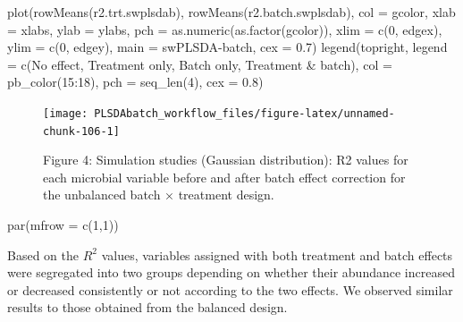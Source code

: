 \documentclass[
]{book}
\newenvironment{Shaded}{\begin{snugshade}}{\end{snugshade}}
\newcommand{\AttributeTok}[1]{\textcolor[rgb]{0.77,0.63,0.00}{#1}}
\newcommand{\DecValTok}[1]{\textcolor[rgb]{0.00,0.00,0.81}{#1}}
\newcommand{\FloatTok}[1]{\textcolor[rgb]{0.00,0.00,0.81}{#1}}
\newcommand{\FunctionTok}[1]{\textcolor[rgb]{0.00,0.00,0.00}{#1}}
\newcommand{\NormalTok}[1]{#1}
\newcommand{\SpecialCharTok}[1]{\textcolor[rgb]{0.00,0.00,0.00}{#1}}
\newcommand{\StringTok}[1]{\textcolor[rgb]{0.31,0.60,0.02}{#1}}
\begin{document}
\begin{Shaded}
\begin{Highlighting}[]
\FunctionTok{plot}\NormalTok{(}\FunctionTok{rowMeans}\NormalTok{(r2.trt.swplsdab), }\FunctionTok{rowMeans}\NormalTok{(r2.batch.swplsdab), }\AttributeTok{col =}\NormalTok{ gcolor, }
     \AttributeTok{xlab =}\NormalTok{ xlabs, }\AttributeTok{ylab =}\NormalTok{ ylabs, }\AttributeTok{pch =} \FunctionTok{as.numeric}\NormalTok{(}\FunctionTok{as.factor}\NormalTok{(gcolor)),}
     \AttributeTok{xlim =} \FunctionTok{c}\NormalTok{(}\DecValTok{0}\NormalTok{, edgex), }\AttributeTok{ylim =} \FunctionTok{c}\NormalTok{(}\DecValTok{0}\NormalTok{, edgey), }\AttributeTok{main =} \StringTok{\textquotesingle{}swPLSDA{-}batch\textquotesingle{}}\NormalTok{, }\AttributeTok{cex =} \FloatTok{0.7}\NormalTok{)}
\FunctionTok{legend}\NormalTok{(}\StringTok{\textquotesingle{}topright\textquotesingle{}}\NormalTok{, }\AttributeTok{legend =} \FunctionTok{c}\NormalTok{(}\StringTok{\textquotesingle{}No effect\textquotesingle{}}\NormalTok{, }\StringTok{\textquotesingle{}Treatment only\textquotesingle{}}\NormalTok{, }
                              \StringTok{\textquotesingle{}Batch only\textquotesingle{}}\NormalTok{, }\StringTok{\textquotesingle{}Treatment \& batch\textquotesingle{}}\NormalTok{), }
       \AttributeTok{col =} \FunctionTok{pb\_color}\NormalTok{(}\DecValTok{15}\SpecialCharTok{:}\DecValTok{18}\NormalTok{), }\AttributeTok{pch =} \FunctionTok{seq\_len}\NormalTok{(}\DecValTok{4}\NormalTok{), }\AttributeTok{cex =} \FloatTok{0.8}\NormalTok{)}
\end{Highlighting}
\end{Shaded}

\begin{figure}

{\centering \texttt{[image: PLSDAbatch\_workflow\_files/figure-latex/unnamed-chunk-106-1]} 

}

\caption{Figure 4: Simulation studies (Gaussian distribution): R2 values for each microbial variable before and after batch effect correction for the unbalanced batch × treatment design.}\label{fig:unnamed-chunk-106}
\end{figure}

\begin{Shaded}
\begin{Highlighting}[]
\FunctionTok{par}\NormalTok{(}\AttributeTok{mfrow =} \FunctionTok{c}\NormalTok{(}\DecValTok{1}\NormalTok{,}\DecValTok{1}\NormalTok{))}
\end{Highlighting}
\end{Shaded}

Based on the \(R^2\) values, variables assigned with both treatment and batch effects were segregated into two groups depending on whether their abundance increased or decreased consistently or not according to the two effects. We observed similar results to those obtained from the balanced design.
\end{document}

